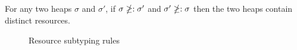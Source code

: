 \begin{lemma}
  For any two heaps $\sigma$ and $\sigma'$, if $\sigma \ngeq: \sigma'$ and $\sigma'
  \ngeq: \sigma$ then the two heaps contain distinct resources.
\end{lemma}

\begin{figure}


\caption{Resource subtyping rules}
\label{fig:subtyping}
\end{figure}


